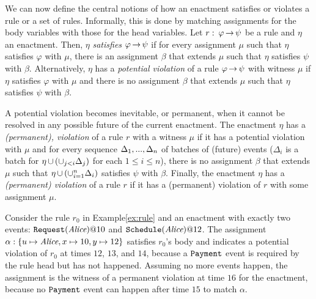 
We can now define the central notions of
how an enactment satisfies or violates
a rule or a set of rules.
Informally, this is done by
matching assignments
for the body variables
with those for the head variables.
Let $r:\:{\varphi}\,{\rightarrow}\,{\psi}$ be a rule
and
$\eta$ an enactment.
Then, $\eta$ {\em satisfies} $\varphi\,{\to}\,\psi$
if for every assignment $\mu$ such that
$\eta$ satisfies $\varphi$ with $\mu$,
there is an assignment $\beta$ that extends $\mu$
such that $\eta$ satisfies $\psi$ with $\beta$.
Alternatively,
$\eta$ has a {\em potential violation}
of a rule ${\varphi}\,{\rightarrow}\,{\psi}$
with witness $\mu$
if
$\eta$ satisfies $\varphi$ with $\mu$ and
there is no assignment $\beta$ that extends $\mu$
such that $\eta$ satisfies $\psi$ with $\beta$.

%
%
A potential violation becomes inevitable, or permanent,
when it cannot be resolved in any possible future
of the current enactment.
The enactment $\eta$ has a {\em (permanent), violation}
of a rule $r$ 
with a witness $\mu$
if it has a potential violation with $\mu$ and
for every sequence $\Delta_1,...,\Delta_{n}$ of batches of (future) events 
($\Delta_i$ is a batch
for $\eta\,{\cup}\,(\cup_{j{<}i}\Delta_j)$
for each $1{\le}i{\le}n$),
there is no assignment $\beta$ that extends $\mu$
such that $\eta\,{\cup}\,(\cup_{i=1}^n\Delta_i)$
satisfies $\psi$ with $\beta$.
Finally,
the enactment $\eta$ has a {\em (permanent) violation}
of a rule $r$
if it has a (permanent) violation of $r$ with
some assignment $\mu$.

\begin{examp}
Consider the rule $r_0$ in Example\:\ref{ex:rule}
and an enactment with exactly two events:
$\texttt{Request}(\mbox{\em Alice})@10$
and $\texttt{Schedule}(\mbox{\em Alice})@12$.
The assignment
$\alpha:\{u\mapsto \mbox{\em Alice}, x\mapsto 10, y\mapsto 12\}$
satisfies $r_0$'s body and
indicates a potential violation of $r_0$
at times $12$, $13$, and $14$,
because a $\texttt{Payment}$ event is required by the rule head
but has not happened.
Assuming no more events happen,
the assignment is the witness of a permanent violation at time $16$
for the enactment,
because no $\texttt{Payment}$ event can happen after time $15$
to match $\alpha$.
\end{examp}

